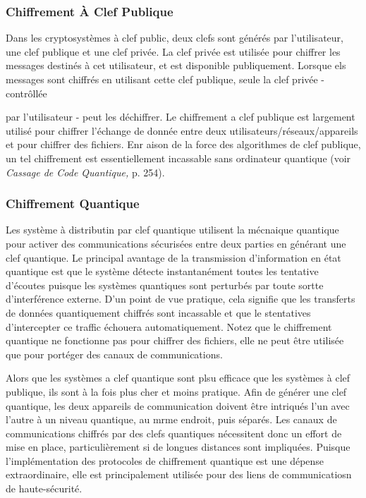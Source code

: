 \subsubsection{Chiffrement À Clef Publique} 

Dans les cryptosystèmes à clef public, deux clefs sont générés par l'utilisateur, une clef publique et une clef privée. La clef privée est utilisée pour chiffrer les messages destinés à cet utilisateur, et est disponible publiquement. Lorsque els messages sont chiffrés en utilisant cette clef publique, seule la clef privée - contrôllée 

par l'utilisateur - peut les déchiffrer. Le chiffrement a clef publique est largement utilisé pour chiffrer l'échange de donnée entre deux utilisateurs/réseaux/appareils et pour chiffrer des fichiers. Enr aison de la force des algorithmes de clef publique, un tel chiffrement est essentiellement incassable sans ordinateur quantique (voir \textit{Cassage de Code Quantique}\textit{,} p. 254). 

\subsubsection{Chiffrement Quantique} 

Les système à distributin par clef quantique utilisent la mécnaique quantique pour activer des communications sécurisées entre deux parties en générant une clef quantique. Le principal avantage de la transmission d'information en état quantique est que le système détecte instantanément toutes les tentative d'écoutes puisque les systèmes quantiques sont perturbés par toute sortte d'interférence externe. D'un point de vue pratique, cela signifie que les transferts de données quantiquement chiffrés sont incassable et que le stentatives d'intercepter ce traffic échouera automatiquement. Notez que le chiffrement quantique ne fonctionne pas pour chiffrer des fichiers, elle ne peut être utilisée que pour portéger des canaux de communications. 

Alors que les systèmes a clef quantique sont plsu efficace que les systèmes à clef publique, ils sont à la fois plus cher et moins pratique. Afin de générer une clef quantique, les deux appareils de communication doivent être intriqués l'un avec l'autre à un niveau quantique, au mrme endroit, puis séparés. Les canaux de communications chiffrés par des clefs quantiques nécessitent donc un effort de mise en place, particulièrement si de longues distances sont impliquées. Puisque l'implémentation des protocoles de chiffrement quantique est une dépense extraordinaire, elle est principalement utilisée pour des liens de communicatiosn de haute-sécurité. 

